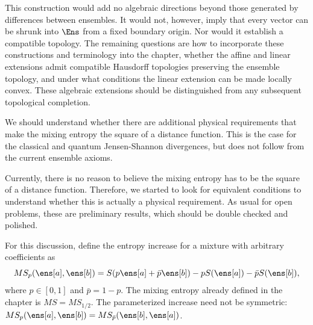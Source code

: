 This construction would add no algebraic directions beyond those generated by differences between ensembles. It would not, however, imply that every vector can be shrunk into $\Ens$ from a fixed boundary origin. Nor would it establish a compatible topology. The remaining questions are how to incorporate these constructions and terminology into the chapter, whether the affine and linear extensions admit compatible Hausdorff topologies preserving the ensemble topology, and under what conditions the linear extension can be made locally convex. These algebraic extensions should be distinguished from any subsequent topological completion.

{We should understand whether there are additional physical requirements that make the mixing entropy the square of a distance function. This is the case for the classical and quantum Jensen-Shannon divergences, but does not follow from the current ensemble axioms.}

Currently, there is no reason to believe the mixing entropy has to be the square of a distance function. Therefore, we started to look for equivalent conditions to understand whether this is actually a physical requirement. As usual for open problems, these are preliminary results, which should be double checked and polished.

For this discussion, define the entropy increase for a mixture with arbitrary coefficients as
\begin{equation}
	MS_p(\ens[a],\ens[b]) = S(p\ens[a]+\bar{p}\ens[b]) - pS(\ens[a]) - \bar{p}S(\ens[b]),
\end{equation}
where $p\in[0,1]$ and $\bar{p}=1-p$. The mixing entropy already defined in the chapter is $MS=MS_{1/2}$. The parameterized increase need not be symmetric: $MS_p(\ens[a],\ens[b])=MS_{\bar{p}}(\ens[b],\ens[a])$.

